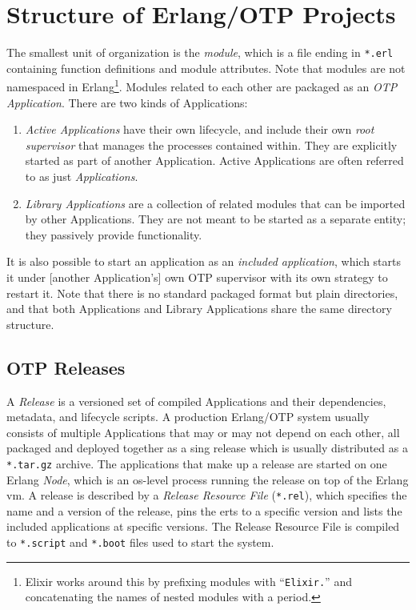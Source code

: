 \section{Structure of Erlang/OTP Projects}

The smallest unit of organization is the \emph{module}, which is a file ending in \lstinline|*.erl| containing function definitions and module attributes. Note that modules are not namespaced in Erlang\footnote{Elixir works around this by prefixing modules with ``\lstinline|Elixir.|'' and concatenating the names of nested modules with a period.}. Modules related to each other are packaged as an \emph{OTP Application}. There are two kinds of Applications:

\begin{enumerate}
  \item \emph{Active Applications} have their own lifecycle, and include their own \emph{root supervisor} that manages the processes contained within. They are explicitly started as part of another Application. Active Applications are often referred to as just \emph{Applications}.\cite{logan:otp}

  \item \emph{Library Applications} are a collection of related modules that can be imported by other Applications. They are not meant to be started as a separate entity; they passively provide functionality.
\end{enumerate}


It is also possible to start an application as an \emph{included application}, which starts it under [another Application's] own OTP supervisor with its own strategy to restart it.\cite{ferd:anger} Note that there is no standard packaged format but plain directories, and that both Applications and Library Applications share the same directory structure.


\subsection{OTP Releases}

A \emph{Release} is a versioned set of compiled Applications and their dependencies, metadata, and lifecycle scripts. A production Erlang/OTP system usually consists of multiple Applications that may or may not depend on each other, all packaged and deployed together as a sing release which is usually distributed as a \lstinline|*.tar.gz| archive. The applications that make up a release are started on one Erlang \emph{Node}, which is an \acrshort{os}-level process running the release on top of the Erlang \acrshort{vm}. A release is described by a \emph{Release Resource File} (\lstinline|*.rel|), which specifies the name and a version of the release, pins the \acrshort{erts} to a specific version and lists the included applications at specific versions. The Release Resource File is compiled to \lstinline|*.script| and \lstinline|*.boot| files used to start the system.


